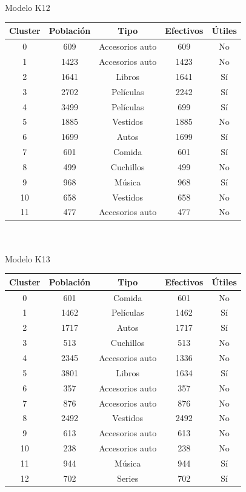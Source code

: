 \\
\\
Modelo K12\\
\begin{tabular}{| c | c | c | c | c |}\hline
Cluster & Población & Tipo & Efectivos & Útiles\\\hline
0 & 609 & Accesorios auto & 609 & No\\
1 & 1423 & Accesorios auto & 1423 & No\\
2 & 1641 & Libros & 1641 & Sí\\
3 & 2702 & Películas & 2242 & Sí\\
4 & 3499 & Películas & 699 & Sí\\
5 & 1885 & Vestidos & 1885 & No\\
6 & 1699 & Autos & 1699 & Sí\\
7 & 601 & Comida & 601 & Sí\\
8 & 499 & Cuchillos & 499 & No\\
9 & 968 & Música & 968 & Sí\\
10 & 658 & Vestidos & 658 & No\\
11 & 477 & Accesorios auto & 477 & No\\\hline
\end{tabular}
\\
\\
Modelo K13\\
\begin{tabular}{| c | c | c | c | c |}\hline
Cluster & Población & Tipo & Efectivos & Útiles\\\hline
0 & 601 & Comida & 601 & No\\
1 & 1462 & Películas & 1462 & Sí\\
2 & 1717 & Autos & 1717 & Sí\\
3 & 513 & Cuchillos & 513 & No\\
4 & 2345 & Accesorios auto & 1336 & No\\
5 & 3801 & Libros & 1634 & Sí\\
6 & 357 & Accesorios auto & 357 & No\\
7 & 876 & Accesorios auto & 876 & No\\
8 & 2492 & Vestidos & 2492 & No\\
9 & 613 & Accesorios auto & 613 & No\\
10 & 238 & Accesorios auto & 238 & No\\
11 & 944 & Música & 944 & Sí\\
12 & 702 & Series & 702 & Sí\\\hline
\end{tabular}\\
